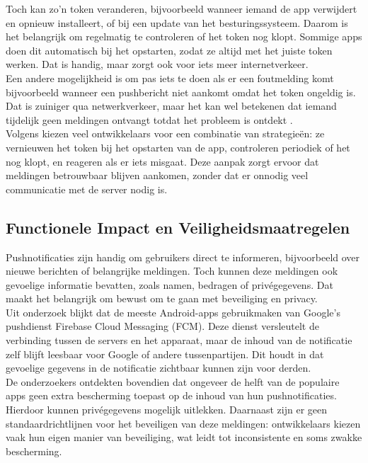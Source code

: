 Toch kan zo’n token veranderen, bijvoorbeeld wanneer iemand de app verwijdert en opnieuw installeert, of bij een update van het besturingssysteem. Daarom is het belangrijk om regelmatig te controleren of het token nog klopt. Sommige apps doen dit automatisch bij het opstarten, zodat ze altijd met het juiste token werken. Dat is handig, maar zorgt ook voor iets meer internetverkeer.\\

Een andere mogelijkheid is om pas iets te doen als er een foutmelding komt bijvoorbeeld wanneer een pushbericht niet aankomt omdat het token ongeldig is. Dat is zuiniger qua netwerkverkeer, maar het kan wel betekenen dat iemand tijdelijk geen meldingen ontvangt totdat het probleem is ontdekt \autocite{pushwoosh2025}.\\

Volgens \textcite{pushwoosh2025} kiezen veel ontwikkelaars voor een combinatie van strategieën: ze vernieuwen het token bij het opstarten van de app, controleren periodiek of het nog klopt, en reageren als er iets misgaat. Deze aanpak zorgt ervoor dat meldingen betrouwbaar blijven aankomen, zonder dat er onnodig veel communicatie met de server nodig is.\\

\subsection{Functionele Impact en Veiligheidsmaatregelen}

Pushnotificaties zijn handig om gebruikers direct te informeren, bijvoorbeeld over nieuwe berichten of belangrijke meldingen. Toch kunnen deze meldingen ook gevoelige informatie bevatten, zoals namen, bedragen of privégegevens. Dat maakt het belangrijk om bewust om te gaan met beveiliging en privacy.\\

Uit onderzoek blijkt dat de meeste Android-apps gebruikmaken van Google’s pushdienst Firebase Cloud Messaging (FCM)\autocite{Neteler2024}. Deze dienst versleutelt de verbinding tussen de servers en het apparaat, maar de inhoud van de notificatie zelf blijft leesbaar voor Google of andere tussenpartijen. Dit houdt in dat gevoelige gegevens in de notificatie zichtbaar kunnen zijn voor derden.\\

De onderzoekers ontdekten bovendien dat ongeveer de helft van de populaire apps geen extra bescherming toepast op de inhoud van hun pushnotificaties. Hierdoor kunnen privégegevens mogelijk uitlekken\autocite{Neteler2024}. Daarnaast zijn er geen standaardrichtlijnen voor het beveiligen van deze meldingen: ontwikkelaars kiezen vaak hun eigen manier van beveiliging, wat leidt tot inconsistente en soms zwakke bescherming\autocite{Neteler2024}.\\

